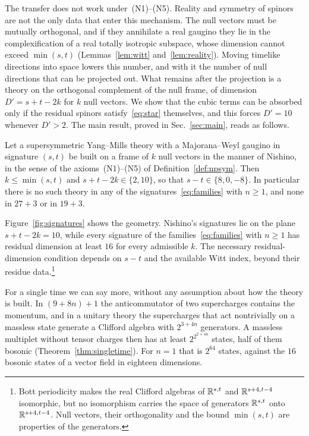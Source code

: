 The transfer does not work under~(N1)--(N5). Reality and symmetry of spinors are not the only data that enter this mechanism. The null vectors must be mutually orthogonal, and if they annihilate a real gaugino they lie in the complexification of a real totally isotropic subspace, whose dimension cannot exceed $\min(s,t)$ (Lemmas~\ref{lem:witt} and~\ref{lem:reality}). Moving timelike directions into space lowers this number, and with it the number of null directions that can be projected out. What remains after the projection is a theory on the orthogonal complement of the null frame, of dimension $D'=s+t-2k$ for $k$ null vectors. We show that the cubic terms can be absorbed only if the residual spinors satisfy~\eqref{eq:star} themselves, and this forces $D'=10$ whenever $D'>2$. The main result, proved in Sec.~\ref{sec:main}, reads as follows.

\begin{maintheorem}
Let a supersymmetric Yang--Mills theory with a Majorana--Weyl gaugino in signature $(s,t)$ be built on a frame of $k$ null vectors in the manner of Nishino, in the sense of the axioms~(N1)--(N5) of Definition~\ref{def:npsym}. Then $k\le\min(s,t)$ and $s+t-2k\in\{2,10\}$, so that $s-t\in\{8,0,-8\}$. In particular there is no such theory in any of the signatures~\eqref{eq:families} with $n\ge1$, and none in $27+3$ or in $19+3$.
\end{maintheorem}

Figure~\ref{fig:signatures} shows the geometry. Nishino's signatures lie on the plane $s+t-2k=10$, while every signature of the families~\eqref{eq:families} with $n\ge1$ has residual dimension at least $16$ for every admissible $k$. The necessary residual-dimension condition depends on $s-t$ and the available Witt index, beyond their residue data.\footnote{Bott periodicity makes the real Clifford algebras of $\mathbb{R}^{s,t}$ and $\mathbb{R}^{s+4,t-4}$ isomorphic, but no isomorphism carries the space of generators $\mathbb{R}^{s,t}$ onto $\mathbb{R}^{s+4,t-4}$. Null vectors, their orthogonality and the bound $\min(s,t)$ are properties of the generators.}

For a single time we can say more, without any assumption about how the theory is built. In $(9+8n)+1$ the anticommutator of two supercharges contains the momentum, and in a unitary theory the supercharges that act nontrivially on a massless state generate a Clifford algebra with $2^{3+4n}$ generators. A massless multiplet without tensor charges then has at least $2^{2^{2+4n}}$ states, half of them bosonic (Theorem~\ref{thm:singletime}). For $n=1$ that is $2^{64}$ states, against the $16$ bosonic states of a vector field in eighteen dimensions.

